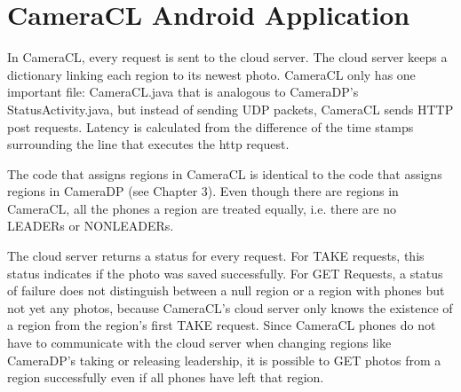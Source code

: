 \chapter{CameraCL Android Application}

In CameraCL, every request is sent to the cloud server. The cloud server keeps a dictionary linking each region to its newest photo.  CameraCL only has one important file: CameraCL.java that is analogous to CameraDP's StatusActivity.java, but instead of sending UDP packets, CameraCL sends HTTP post requests. Latency is calculated from the difference of the time stamps surrounding the line that executes the http request.

The code that assigns regions in CameraCL is identical to the code that assigns regions in CameraDP (see Chapter 3). Even though there are regions in CameraCL, all the phones a region are treated equally, i.e. there are no LEADERs or NONLEADERs.

The cloud server returns a status for every request. For TAKE requests, this status indicates if the photo was saved successfully. For GET Requests, a status of failure does not distinguish between a null region or a region with phones but not yet any photos, because CameraCL's cloud server only knows the existence of a region from the region's first TAKE request. Since CameraCL phones do not have to communicate with the cloud server when changing regions like CameraDP's taking or releasing leadership, it is possible to GET photos from a region successfully even if all phones have left that region.